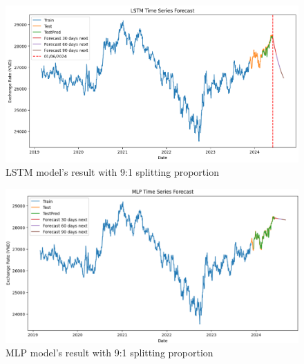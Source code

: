 \documentclass{ieeeojies}
\begin{document}
\begin{figure}[H]
  \centering
  \begin{minipage}{0.8\linewidth}
    \centering
    \includegraphics[width=\linewidth]{LSTM/lstm_eur91.png}
    \caption{LSTM model's result with 9:1 splitting proportion}
    \label{fig16}
  \end{minipage}
\end{figure}
\begin{figure}[H]
  \centering
  \begin{minipage}{0.8\linewidth}
    \centering
    \includegraphics[width=\linewidth]{MLP/mlp_eur_91.png}
    \caption{MLP model's result with 9:1 splitting proportion}
    \label{fig17}
  \end{minipage}
\end{figure}
\end{document}
